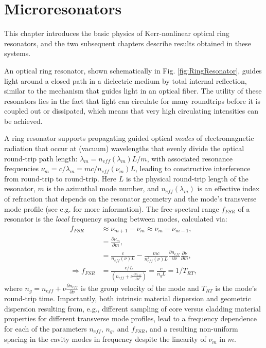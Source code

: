 \chapter{Microresonators}
 \label{ch:microresonators}
 
 This chapter introduces the basic physics of Kerr-nonlinear optical ring resonators, and the two  subsequent chapters describe results obtained in these systems.
 
An optical ring resonator, shown schematically in Fig. \ref{fig:RingResonator}, guides light around a closed path in a dielectric medium by total internal reflection, similar to the mechanism that guides light in an optical fiber. The utility of these resonators lies in the fact that light can circulate for many roundtrips before it is coupled out or dissipated, which means that very high circulating intensities can be achieved.

A ring resonator supports propagating guided optical \textit{modes} of electromagnetic radiation that occur at (vacuum) wavelengths that evenly divide the optical round-trip path length: $\lambda_m=n_{eff}(\lambda_m)L/m$, with associated resonance frequencies $\nu_m=c/\lambda_m=mc/n_{eff}(\nu_m)L$, leading to constructive interference from round-trip to round-trip. Here $L$ is the physical round-trip length of the resonator, $m$ is the azimuthal mode number, and $n_{eff}(\lambda_m)$ is an effective index of refraction that depends on the resonator geometry and the mode's transverse mode profile (see e.g. \cite{REFHERE} for more information). The free-spectral range $f_{FSR}$ of a resonator is the \textit{local} frequency spacing between modes, calculated via:
\begin{align}
	f_{FSR}&\approx \nu_{m+1}-\nu_{m}\approx \nu_{m}-\nu_{m-1},\\
	&=\frac{\partial\nu_m}{\partial m},\\
	&=\frac{c}{n_{eff}(\nu)L}-\frac{mc}{n_{eff}^2(\nu)L}\frac{\partial n_{eff}}{\partial \nu}\frac{\partial \nu}{\partial m},\\
	\Rightarrow f_{FSR}&=\frac{c/L}{\left(n_{eff}+\nu\frac{\partial n_{eff}}{\partial \nu}\right)}=\frac{c}{n_g L}=1/T_{RT},
\end{align}
	where $n_g=n_{eff}+\nu\frac{\partial n_{eff}}{\partial \nu}$ is the group velocity of the mode and $T_{RT}$ is the mode's round-trip time. Importantly, both intrinsic material dispersion and geometric dispersion resulting from, e.g., different sampling of core versus cladding material properties for different transverse mode profiles, lead to a frequency dependence for each of the parameters $n_{eff}$, $n_g$, and $f_{FSR}$, and a resulting non-uniform spacing in the cavity modes in frequency despite the linearity of $\nu_m$ in $m$. 
	
